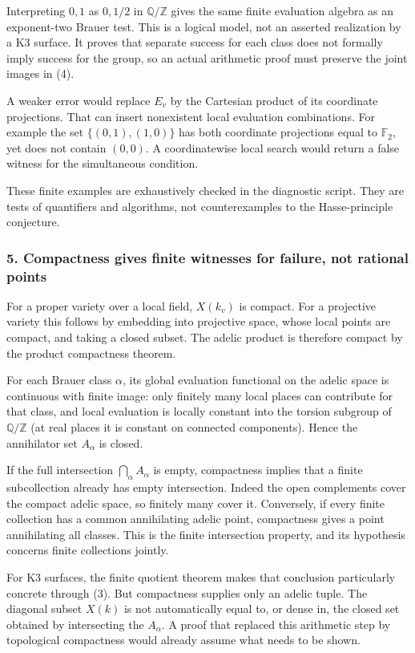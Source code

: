 \documentclass[11pt]{article}
\begin{document}
Interpreting $0,1$ as $0,1/2$ in $\mathbb Q/\mathbb Z$ gives the same finite evaluation algebra as an exponent-two Brauer test. This is a logical model, not an asserted realization by a K3 surface. It proves that separate success for each class does not formally imply success for the group, so an actual arithmetic proof must preserve the joint images in (4).

A weaker error would replace $E_v$ by the Cartesian product of its coordinate projections. That can insert nonexistent local evaluation combinations. For example the set $\{(0,1),(1,0)\}$ has both coordinate projections equal to $\mathbb F_2$, yet does not contain $(0,0)$. A coordinatewise local search would return a false witness for the simultaneous condition.

These finite examples are exhaustively checked in the diagnostic script. They are tests of quantifiers and algorithms, not counterexamples to the Hasse-principle conjecture.

\subsubsection{5. Compactness gives finite witnesses for failure, not rational points}
For a proper variety over a local field, $X(k_v)$ is compact. For a projective variety this follows by embedding into projective space, whose local points are compact, and taking a closed subset. The adelic product is therefore compact by the product compactness theorem.

For each Brauer class $\alpha$, its global evaluation functional on the adelic space is continuous with finite image: only finitely many local places can contribute for that class, and local evaluation is locally constant into the torsion subgroup of $\mathbb Q/\mathbb Z$ (at real places it is constant on connected components). Hence the annihilator set $A_\alpha$ is closed.

If the full intersection $\bigcap_\alpha A_\alpha$ is empty, compactness implies that a finite subcollection already has empty intersection. Indeed the open complements cover the compact adelic space, so finitely many cover it. Conversely, if every finite collection has a common annihilating adelic point, compactness gives a point annihilating all classes. This is the finite intersection property, and its hypothesis concerns finite collections jointly.

For K3 surfaces, the finite quotient theorem makes that conclusion particularly concrete through (3). But compactness supplies only an adelic tuple. The diagonal subset $X(k)$ is not automatically equal to, or dense in, the closed set obtained by intersecting the $A_\alpha$. A proof that replaced this arithmetic step by topological compactness would already assume what needs to be shown.
\end{document}

